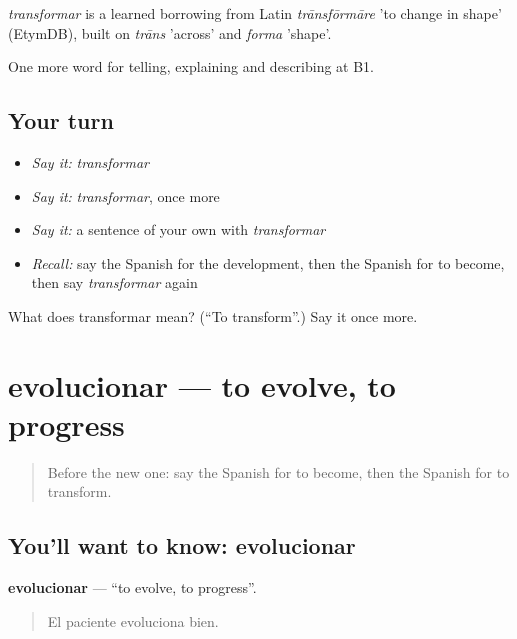 \begin{cousinweb}
\emph{transformar} is a learned borrowing from Latin \emph{trānsfōrmāre} 'to change in shape' (EtymDB), built on \emph{trāns} 'across' and \emph{forma} 'shape'.
\end{cousinweb}

\begin{grammarlens}[title={What you've built}]
One more word for telling, explaining and describing at B1.
\end{grammarlens}

\subsection*{Your turn}
\begin{itemize}
\raggedright
  \item \emph{Say it:} \emph{transformar}
  \item \emph{Say it:} \emph{transformar}, once more
  \item \emph{Say it:} a sentence of your own with \emph{transformar}
  \item \emph{Recall:} say the Spanish for the development, then the Spanish for to become, then say \emph{transformar} again
\end{itemize}

\begin{tcolorbox}[breakable,colback=teal!4,colframe=teal!35!black,title={Before you move on}]
What does transformar mean? (\textquotedblleft{}To transform\textquotedblright{}.) Say it once more.
\end{tcolorbox}
\section[evolucionar]{evolucionar — to evolve, to progress}

\label{lesson:ES-C572-evolucionar}



\begin{quote}
Before the new one: say the Spanish for to become, then the Spanish for to transform.
\end{quote}

\subsection*{You'll want to know: evolucionar}
\textbf{evolucionar} — \textquotedblleft{}to evolve, to progress\textquotedblright{}.

\begin{quote}
El paciente evoluciona bien.
\end{quote}

